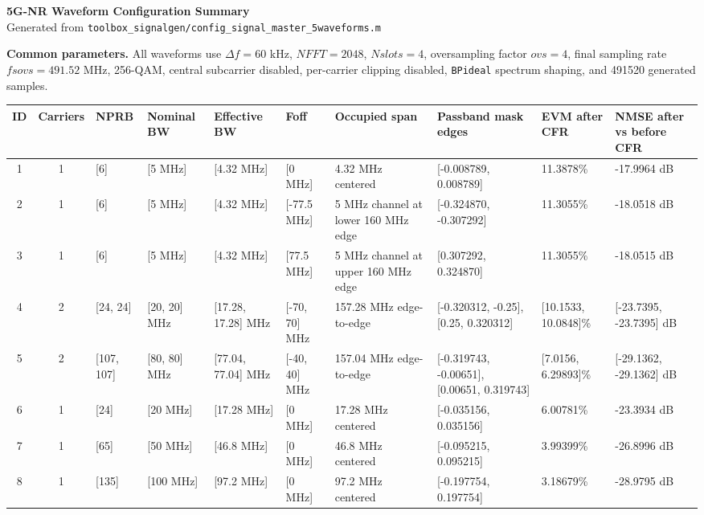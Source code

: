 \documentclass[8pt]{article}
\begin{document}
\begin{center}
{\Large \textbf{5G-NR Waveform Configuration Summary}}\\
{\small Generated from \texttt{toolbox\_signalgen/config\_signal\_master\_5waveforms.m}}
\end{center}

\vspace{0.4em}

\textbf{Common parameters.}
All waveforms use $\Delta f = 60$ kHz, $NFFT = 2048$, $Nslots = 4$, oversampling factor $ovs = 4$, final sampling rate $fsovs = 491.52$ MHz, 256-QAM, central subcarrier disabled, per-carrier clipping disabled, \texttt{BPideal} spectrum shaping, and 491520 generated samples.

\vspace{0.8em}

{\scriptsize
\begin{tabular}{|c|c|p{0.62in}|p{0.86in}|p{0.95in}|p{0.98in}|p{1.0in}|p{1.35in}|p{1.05in}|p{1.25in}|}
\hline
\textbf{ID} &
\textbf{Carriers} &
\textbf{NPRB} &
\textbf{Nominal BW} &
\textbf{Effective BW} &
\textbf{Foff} &
\textbf{Occupied span} &
\textbf{Passband mask edges} &
\textbf{EVM after CFR} &
\textbf{NMSE after vs before CFR} \\
\hline
1 & 1 & [6] & [5 MHz] & [4.32 MHz] & [0 MHz] & 4.32 MHz centered & [-0.008789, 0.008789] & 11.3878\% & -17.9964 dB \\
\hline
2 & 1 & [6] & [5 MHz] & [4.32 MHz] & [-77.5 MHz] & 5 MHz channel at lower 160 MHz edge & [-0.324870, -0.307292] & 11.3055\% & -18.0518 dB \\
\hline
3 & 1 & [6] & [5 MHz] & [4.32 MHz] & [77.5 MHz] & 5 MHz channel at upper 160 MHz edge & [0.307292, 0.324870] & 11.3055\% & -18.0515 dB \\
\hline
4 & 2 & [24, 24] & [20, 20] MHz & [17.28, 17.28] MHz & [-70, 70] MHz & 157.28 MHz edge-to-edge & [-0.320312, -0.25], [0.25, 0.320312] & [10.1533, 10.0848]\% & [-23.7395, -23.7395] dB \\
\hline
5 & 2 & [107, 107] & [80, 80] MHz & [77.04, 77.04] MHz & [-40, 40] MHz & 157.04 MHz edge-to-edge & [-0.319743, -0.00651], [0.00651, 0.319743] & [7.0156, 6.29893]\% & [-29.1362, -29.1362] dB \\
\hline
6 & 1 & [24] & [20 MHz] & [17.28 MHz] & [0 MHz] & 17.28 MHz centered & [-0.035156, 0.035156] & 6.00781\% & -23.3934 dB \\
\hline
7 & 1 & [65] & [50 MHz] & [46.8 MHz] & [0 MHz] & 46.8 MHz centered & [-0.095215, 0.095215] & 3.99399\% & -26.8996 dB \\
\hline
8 & 1 & [135] & [100 MHz] & [97.2 MHz] & [0 MHz] & 97.2 MHz centered & [-0.197754, 0.197754] & 3.18679\% & -28.9795 dB \\
\hline
\end{tabular}
}
\end{document}
